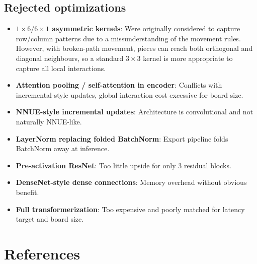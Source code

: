 \documentclass[11pt,a4paper]{article}
\begin{document}
\subsection{Rejected optimizations}
\begin{itemize}
  \item \textbf{$1\times6/6\times1$ asymmetric kernels}: Were originally considered to capture row/column patterns due to a missunderstanding of the movement rules. However, with broken-path movement, pieces can reach both orthogonal and diagonal neighbours, so a standard $3\times3$ kernel is more appropriate to capture all local interactions.
  \item \textbf{Attention pooling / self-attention in encoder}: Conflicts with incremental-style updates, global interaction cost excessive for board size.
  \item \textbf{NNUE-style incremental updates}: Architecture is convolutional and not naturally NNUE-like.
  \item \textbf{LayerNorm replacing folded BatchNorm}: Export pipeline folds BatchNorm away at inference.
  \item \textbf{Pre-activation ResNet}: Too little upside for only 3 residual blocks.
  \item \textbf{DenseNet-style dense connections}: Memory overhead without obvious benefit.
  \item \textbf{Full transformerization}: Too expensive and poorly matched for latency target and board size.
\end{itemize}

\clearpage
\section{References}
\end{document}
